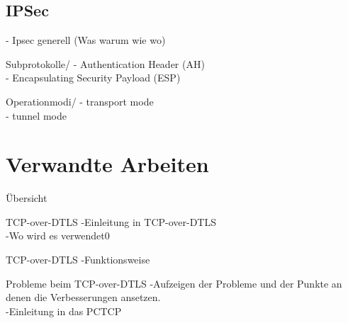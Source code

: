 \documentclass{beamer}
\begin{document}
\subsection{IPSec}
\begin{frame}{\subsecname}{\secname}
- Ipsec generell (Was warum wie wo)\\
\end{frame}

\begin{frame}{Subprotokolle}{\secname/\subsecname}
- Authentication Header (AH)\\
- Encapsulating Security Payload (ESP)\\
\end{frame}

\begin{frame}{Operationmodi}{\secname/\subsecname}
- transport mode\\
- tunnel mode\\
\end{frame}

\section{Verwandte Arbeiten}

\begin{frame}{Übersicht}
\tableofcontents[sectionstyle=show/shaded, subsectionstyle=show/hide/hide]
\end{frame}

\begin{frame}{TCP-over-DTLS}{\secname}
-Einleitung in TCP-over-DTLS\\
-Wo wird es verwendet0\\

\end{frame}

\begin{frame}{TCP-over-DTLS}{\secname}
-Funktionsweise

\end{frame}

\begin{frame}{Probleme beim TCP-over-DTLS}{\secname}
-Aufzeigen der Probleme und der Punkte an denen die Verbesserungen ansetzen.\\
-Einleitung in das PCTCP
\end{frame}
\end{document}
